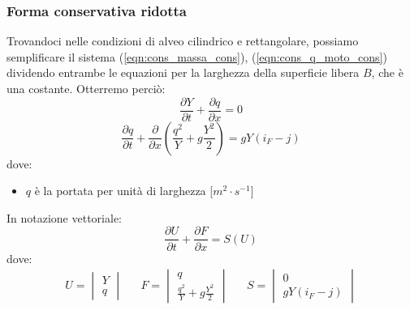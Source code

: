 \documentclass[12pt]{article} %
\begin{document}
\subsubsection{Forma conservativa ridotta}
\noindent Trovandoci nelle condizioni di alveo cilindrico e rettangolare, possiamo semplificare il sistema (\ref{eqn:cons_massa_cons}), (\ref{eqn:cons_q_moto_cons}) dividendo entrambe le equazioni per la larghezza della superficie libera $B$, che è una costante. Otterremo perciò:
\begin{equation}
    \frac{\partial Y}{\partial t}+\frac{\partial q}{\partial x}=0
    \label{eqn:cons_massa_cons_rid}
\end{equation}
\begin{equation}
    \frac{\partial q }{\partial t}+\frac{\partial}{\partial x}\left(\frac{q^2}{Y}+g\frac{Y^2}{2}\right)={gY\left(i_F-j\right)}
    \label{eqn:cons_q_moto_cons_rid}
\end{equation}
dove:
\begin{itemize}
    \item $q$ è la portata per unità di larghezza [$m^2\cdot s^{-1}$]
\end{itemize}
\noindent In notazione vettoriale:
\begin{equation}
    \frac{\partial U}{\partial t}+\frac{\partial F}{\partial x}  = S(U)
    \label{eqn:forma_cons_rid_vett}
\end{equation}
\noindent dove:
\begin{align*}
    U=\begin{vmatrix}Y\\q\end{vmatrix} &&
    F=\begin{vmatrix}q\\\frac{q^2}{Y}+g\frac{Y^2}{2}\end{vmatrix} &&
    S=\begin{vmatrix}0\\gY(i_F-j)\end{vmatrix}
\end{align*}
\end{document}
